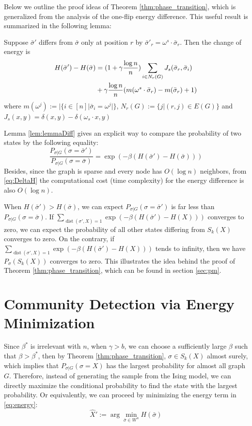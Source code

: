 \documentclass[entropy,article,submit,moreauthors,pdftex]{Definitions/mdpi}
\newcommand{\1}{\mathbbm{1}}
\DeclareMathOperator{\Dist}{dist}
\begin{document}
Below we outline the proof ideas of Theorem \ref{thm:phase_transition}, which is generalized from the analysis of the one-flip energy difference.
This useful result is summarized in the following lemma:
\begin{Lemma}\label{lem:lemmaDiff}
	Suppose $\bar{\sigma}'$ differs from $\bar{\sigma}$ only at position $r$ by $\bar{\sigma}'_r = \omega^s \cdot \bar{\sigma}_r$.
	Then the change of energy is
	\begin{align}
	H(\bar{\sigma}') - H(\bar{\sigma}) &= (1+\gamma \frac{\log n}{n})\sum_{i \in N_r(G)} J_s(\bar{\sigma}_r, \bar{\sigma}_i)
	\notag \\
	&+ \gamma \frac{\log n}{n} (m(\omega^s \cdot \bar{\sigma}_r)-m(\bar{\sigma}_r)+1) \label{eq:DeltaH}
	\end{align}
	where $m(\omega^j) := |\{i \in [n] | \bar{\sigma}_i = \omega^j | \}$, $N_r(G):=\{j | (r, j) \in E(G) \}$ and $J_s(x, y) = \delta(x, y) - \delta(\omega_s \cdot x, y)$
\end{Lemma}
Lemma \ref{lem:lemmaDiff} gives an explicit way to compare the probability of two states by the following
equality:
\begin{equation}\label{eq:Pratio}
\frac{P_{\sigma |G } (\sigma = \bar{\sigma}')}{P_{\sigma |G } (\sigma = \bar{\sigma})}
= \exp(-\beta(H(\bar{\sigma}') - H(\bar{\sigma})))
\end{equation}
Besides, since the graph is sparse and every node has $O(\log n)$ neighbors, from \eqref{eq:DeltaH} the computational cost (time complexity) for the energy difference
is also $O(\log n)$. 

When $H(\bar{\sigma}') > H(\bar{\sigma})$, we can expect $P_{\sigma | G}(\sigma = \bar{\sigma}')$ is far less than 
$P_{\sigma | G}(\sigma = \bar{\sigma})$.
If  $ \sum_{\Dist(\sigma', X)=1}\exp(-\beta(H(\bar{\sigma}') - H(X))) $ converges to zero,
we can expect the probability of all other states differing from $S_k(X)$ converges to zero.
On the contrary, if $ \sum_{\Dist(\sigma', X)=1}\exp(-\beta(H(\bar{\sigma}') - H(X))) $ tends to infinity,
then we have $P_{\sigma}(S_k(X))$ converges to zero. This illustrates the idea behind
the proof of
Theorem \ref{thm:phase_transition}, which can be found in section \ref{sec:pm}.


\section{Community Detection via Energy Minimization}\label{sec:em}
Since $\beta^*$ is irrelevant with $n$, when $\gamma>b$, we can choose a sufficiently large $\beta$ such that
$\beta > \beta^*$, then by Theorem \ref{thm:phase_transition}, $\sigma \in S_k(X)$ almost surely, which
implies that $P_{\sigma | G}(\sigma = X)$ has the largest probability for almost all graph $G$. Therefore, instead of generating
the sample from the Ising model, we can directly maximize the conditional probability to find the state with the largest probability.
Or equivalently, we can proceed by minimizing the energy term in \eqref{eq:energy}:
\begin{equation}\label{eq:hatX}
\hat{X}' := \arg\min_{\bar{\sigma} \in W^n} H(\bar{\sigma})
\end{equation}
\end{document}
